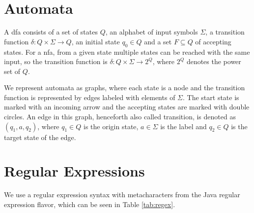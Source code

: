 \section{Automata}\label{sec:background:automata}

A \acf{dfa} consists of a set of states $Q$, an alphabet of input symbols $\Sigma$, a transition function $\delta: Q \times \Sigma \rightarrow Q$, an initial state $q_0 \in Q$ and a set $F \subseteq Q$ of accepting states.
For a \acf{nfa}, from a given state multiple states can be reached with the same input, so the transition function is  $\delta: Q \times \Sigma \rightarrow 2^Q$, where $2^Q$ denotes the power set of $Q$.

We represent automata as graphs, where each state is a node and the transition function is represented by edges labeled with elements of $\Sigma$. The start state is marked with an incoming arrow and the accepting states are marked with double circles.
An edge in this graph, henceforth also called transition, is denoted as $(q_1, a, q_2)$, where $q_1 \in Q$ is the origin state, $a \in \Sigma$ is the label and $q_2 \in Q$ is the target state of the edge.

\newpage
\section{Regular Expressions}\label{sec:background:regex}

We use a regular expression syntax with metacharacters from the Java regular expression flavor, which can be seen in Table \ref{tab:regex}.

